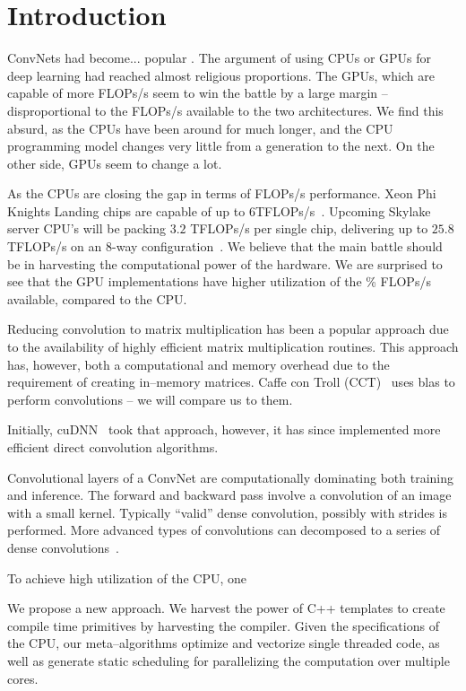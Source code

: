 \section{Introduction}

  ConvNets had become... popular .
  The argument of using CPUs or GPUs for deep learning had reached
  almost religious proportions.  The GPUs, which are capable of more
  FLOPs/s seem to win the battle by a large margin -- disproportional
  to the FLOPs/s available to the two architectures.  We find this
  absurd, as the CPUs have been around for much longer, and the CPU
  programming model changes very little from a generation to the next.
  On the other side, GPUs seem to change a lot.

  As the CPUs are closing the gap in terms of FLOPs/s performance.
  Xeon Phi Knights Landing chips are capable of up to
  6TFLOPs/s~\cite{}.  Upcoming Skylake server CPU's will be packing
  $3.2$ TFLOPs/s per single chip, delivering up to $25.8$ TFLOPs/s on
  an 8-way configuration~\cite{}.  We believe that the main battle
  should be in harvesting the computational power of the hardware.  We
  are surprised to see that the GPU implementations have higher
  utilization of the \% FLOPs/s available, compared to the CPU.

  Reducing convolution to matrix multiplication has been a popular
  approach due to the availability of highly efficient matrix
  multiplication routines.  This approach has, however, both a
  computational and memory overhead due to the requirement of creating
  in--memory matrices.  Caffe con Troll (CCT)~\cite{hadjis2015shallow}
  uses blas to perform convolutions -- we will compare us to them.

  Initially, cuDNN~\cite{chetlur2014cudnn} took that approach,
  however, it has since implemented more efficient direct convolution
  algorithms.

  Convolutional layers of a ConvNet are computationally dominating
  both training and inference.  The forward and backward pass involve
  a convolution of an image with a small kernel.  Typically ``valid''
  dense convolution, possibly with strides is performed.  More
  advanced types of convolutions can decomposed to a series of dense
  convolutions~\cite{szegedy2015going}.

  To achieve high utilization of the CPU, one


  We propose a new approach.  We harvest the power of C++ templates to
  create compile time primitives by harvesting the compiler.  Given
  the specifications of the CPU, our meta--algorithms optimize and
  vectorize single threaded code, as well as generate static
  scheduling for parallelizing the computation over multiple cores.

